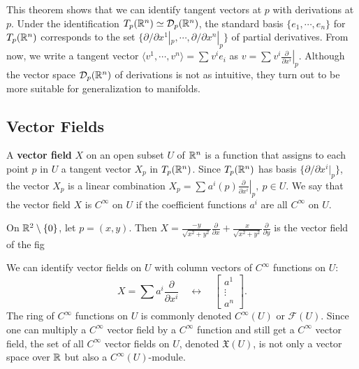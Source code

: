     This theorem shows that we can identify tangent vectors at $p$ with derivations at $p$. Under the identification $T_p(\mathbb{R}^n )\simeq \mathcal{D} _p (\mathbb{R}^n )$, the standard basis $\{e_1,\cdots ,e_n \} $ for $T_p(\mathbb{R}^n )$ corresponds to the set $\{\partial /\partial x^1|_p,\cdots ,\partial /\partial x^n |_p\}$ of partial derivatives. From now, we write a tangent vector $\langle v^1,\cdots ,v^n  \rangle =\sum_{}^{} v^i e_i $ as $v=\sum_{}^{} v^i  \left. \frac{\partial }{\partial x^i } \right| _p$. Although the vector space $\mathcal{D} _p(\mathbb{R}^n )$ of derivations is not as intuitive, they turn out to be more suitable for generalization to manifolds.

\subsection{Vector Fields}
A \textbf{vector field} $X$ on an open subset $U$ of $\mathbb{R}^n $ is a function that assigns to each point $p$ in $U$ a tangent vector $X_p$ in $T_p(\mathbb{R}^n )$. Since $T_p(\mathbb{R}^n )$ has basis $\{\partial /\partial x^i |_p\} $, the vector $X_p$ is a linear combination $
    X_p = \sum_{}^{} a^i (p) \left. \frac{\partial }{\partial x^i } \right| _p, \ p \in U.$ We say that the vector field $X$ is $C^{\infty}$ on $U$ if the coefficient functions $a^i $ are all $C^{\infty}$ on $U$.
        \begin{example}
            On $\mathbb{R}^2\setminus \{0\} $, let $p=(x,y)$. Then $X= \frac{-y}{\sqrt{x^2+y^2} }\frac{\partial }{\partial x}+\frac{x}{\sqrt{x^2+y^2} }\frac{\partial }{\partial y}$ is the vector field of the fig
        \end{example}
We can identify vector fields on $U$ with column vectors of $C^{\infty}$ functions on $U$: \[
X=\sum a^i  \frac{\partial }{\partial x^i }\quad \longleftrightarrow \quad
\begin{bmatrix}
    a^1\\ \vdots \\ a^n 
\end{bmatrix}.
\] The ring of $C^{\infty}$ functions on $U$ is commonly denoted $C^{\infty}(U)$ or $\mathcal{F} (U)$. Since one can multiply a $C^{\infty}$ vector field by a $C^{\infty}$ function and still get a $C^{\infty}$ vector field, the set of all $C^{\infty}$ vector fields on $U$, denoted $\mathfrak X (U)$, is not only a vector space over $\mathbb{R}$ but also a $C^{\infty}(U)$-module. 
